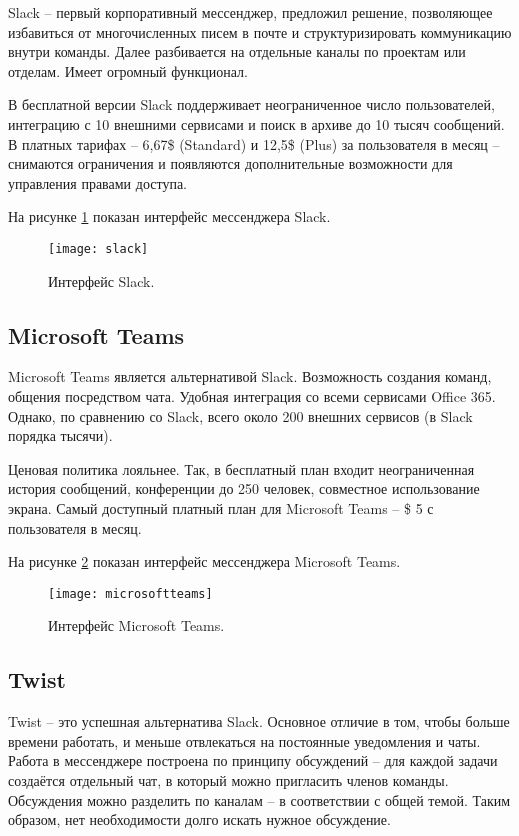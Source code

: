 Slack \cite{slack} -- первый корпоративный мессенджер, предложил решение, позволяющее избавиться от многочисленных писем в почте и структуризировать коммуникацию внутри команды. Далее разбивается на отдельные каналы по проектам или отделам. Имеет огромный функционал. 

В бесплатной версии Slack поддерживает неограниченное число пользователей, интеграцию с 10 внешними сервисами и поиск в архиве до 10 тысяч сообщений. В платных тарифах -- 6,67\$ (Standard) и 12,5\$ (Plus) за пользователя в месяц -- снимаются ограничения и появляются дополнительные возможности для управления правами доступа. 

На рисунке \ref{img:slack} показан интерфейс мессенджера Slack. 

\begin{figure}[H]
	\centering
	\texttt{[image: slack]}
	\caption{Интерфейс Slack. }
	\label{img:slack}
\end{figure}

\subsection{\textbf{Microsoft Teams}}

Microsoft Teams \cite{micteams} является альтернативой Slack. Возможность создания команд, общения посредством чата. Удобная интеграция со всеми сервисами Office 365. Однако, по сравнению со Slack, всего около 200 внешних сервисов (в Slack порядка тысячи). 

Ценовая политика лояльнее. Так, в бесплатный план входит неограниченная история сообщений, конференции до 250 человек, совместное использование экрана. Самый доступный платный план для Microsoft Teams -- \$ 5 с пользователя в месяц. 

На рисунке \ref{img:microsoftteams} показан интерфейс мессенджера Microsoft Teams. 

\begin{figure}[H]
	\centering
	\texttt{[image: microsoftteams]}
	\caption{Интерфейс Microsoft Teams. }
	\label{img:microsoftteams}
\end{figure}

\subsection{\textbf{Twist}}

Twist \cite{twist} -- это успешная альтернатива Slack. Основное отличие в том, чтобы больше времени работать, и меньше отвлекаться на постоянные уведомления и чаты. Работа в мессенджере построена по принципу обсуждений -- для каждой задачи создаётся отдельный чат, в который можно пригласить членов команды. Обсуждения можно разделить по каналам -- в соответствии с общей темой. Таким образом, нет необходимости долго искать нужное обсуждение. 

